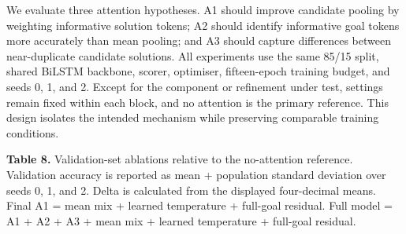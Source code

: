 \documentclass[11pt]{article}
\begin{document}
We evaluate three attention hypotheses. A1 should improve candidate pooling by weighting informative solution tokens; A2 should identify informative goal tokens more accurately than mean pooling; and A3 should capture differences between near-duplicate candidate solutions. All experiments use the same 85/15 split, shared BiLSTM backbone, scorer, optimiser, fifteen-epoch training budget, and seeds 0, 1, and 2. Except for the component or refinement under test, settings remain fixed within each block, and no attention is the primary reference. This design isolates the intended mechanism while preserving comparable training conditions.

\textbf{Table 8.} Validation-set ablations relative to the no-attention reference. Validation accuracy is reported as mean + population standard deviation over seeds 0, 1, and 2. Delta is calculated from the displayed four-decimal means. Final A1 = mean mix + learned temperature + full-goal residual. Full model = A1 + A2 + A3 + mean mix + learned temperature + full-goal residual.
\end{document}
